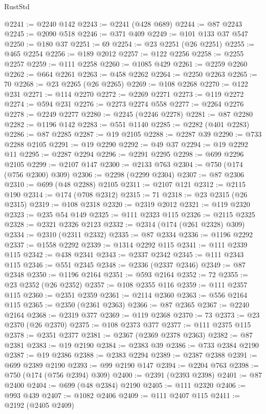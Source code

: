 \begin{lexlean}{RustStd}
\begin{coremodule}
{\begin{coremodule}
{{{{{{{{{{{{{{{{{{{{{{{{{{{{{{{{{{{{{{{{{{{{{{{{{{{{{{{{{{{{{{{{{{{{{{{{{{{{{{@2241 := @2240 @142
@2243 := @2241 (@428 @689)
@2244 := @87 @2243
@2245 := @2090 @518
@2246 := @371 @409
@2249 := @101 @133 @37 @547
@2250 := @180 @37
@2251 := 69
@2254 := @23 @2251 (@26 @2251)
@2255 := @465 @2254
@2256 := @189 @2012
@2257 := @122 @2256
@2258 := @2255 @2257
@2259 := @111 @2258
@2260 := @1085 @429
@2261 := @2259 @2260
@2262 := @664 @2261
@2263 := @458 @2262
@2264 := @2250 @2263
@2265 := 70
@2268 := @23 @2265 (@26 @2265)
@2269 := @108 @2268
@2270 := @122 @231
@2271 := @114 @2270
@2272 := @2269 @2271
@2273 := @119 @2272
@2274 := @594 @231
@2276 := @2273 @2274 @558
@2277 := @2264 @2276
@2278 := @2249 @2277
@2280 := @2245 (@2246 @2278)
@2281 := @87 @2280
@2282 := @1196 @142
@2283 := @551 @1140
@2285 := @2282 (@401 @2283)
@2286 := @87 @2285
@2287 := @19 @2105
@2288 := @2287 @39
@2290 := @733 @2288 @2105
@2291 := @19 @2290
@2292 := @49 @37
@2294 := @19 @2292 @11
@2295 := @2287 @2294
@2296 := @2291 @2295
@2298 := @699 @2296 @2105
@2299 := @2107 @147
@2300 := @2133 @763
@2304 := @750 (@174 (@756 @2300) @309)
@2306 := @2298 (@2299 @2304)
@2307 := @87 @2306
@2310 := @699 (@48 @2288) @2105
@2311 := @2107 @121
@2312 := @2115 @190
@2314 := @174 (@708 @2312)
@2315 := 71
@2318 := @23 @2315 (@26 @2315)
@2319 := @108 @2318
@2320 := @2319 @2012
@2321 := @119 @2320
@2323 := @235 @54 @149
@2325 := @111 @2323 @115
@2326 := @2115 @2325
@2328 := @2321 @2326 @2123
@2332 := @2314 (@174 (@261 @2328) @309)
@2334 := @2310 (@2311 @2332)
@2335 := @87 @2334
@2336 := @1196 @2292
@2337 := @1558 @2292
@2339 := @1314 @2292 @115
@2341 := @111 @2339 @115
@2342 := @438 @2341
@2343 := @2337 @2342
@2345 := @111 @2343 @115
@2346 := @551 @2345
@2348 := @2336 (@2337 @2346)
@2349 := @87 @2348
@2350 := @1196 @2164
@2351 := @593 @2164
@2352 := 72
@2355 := @23 @2352 (@26 @2352)
@2357 := @108 @2355 @116
@2359 := @111 @2357 @115
@2360 := @2351 @2359
@2361 := @2114 @2360
@2363 := @556 @2164 @115
@2365 := @2350 (@2361 @2363)
@2366 := @87 @2365
@2367 := @2240 @2164
@2368 := @2319 @377
@2369 := @119 @2368
@2370 := 73
@2373 := @23 @2370 (@26 @2370)
@2375 := @108 @2373 @377
@2377 := @111 @2375 @115
@2378 := @2351 @2377
@2381 := @2367 (@2369 @2378 @2363)
@2382 := @87 @2381
@2383 := @19 @2190
@2384 := @2383 @39
@2386 := @733 @2384 @2190
@2387 := @19 @2386
@2388 := @2383 @2294
@2389 := @2387 @2388
@2391 := @699 @2389 @2190
@2393 := @99 @2190 @147
@2394 := @2204 @763
@2398 := @750 (@174 (@756 @2394) @309)
@2400 := @2391 (@2393 @2398)
@2401 := @87 @2400
@2404 := @699 (@48 @2384) @2190
@2405 := @111 @2320
@2406 := @993 @439
@2407 := @1082 @2406
@2409 := @111 @2407 @115
@2411 := @2192 (@2405 @2409)
}}}}}}}}}}}}}}}}}}}}}}}}}}}}}}}}}}}}}}}}}}}}}}}}}}}}}}}}}}}}}}}}}}}}}}}}}}}}}}
\end{coremodule}}
\end{coremodule}
\end{lexlean}
